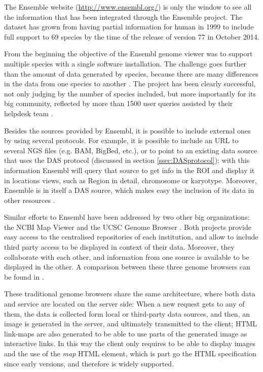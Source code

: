 The Ensemble website (\url{http://www.ensembl.org/}) is only the window to see all the information that has been integrated through the Ensemble project. The dataset has grown from having partial information for human in 1999 to include full support to 69 species by the time of the release of version 77 in October 2014. 

From the beginning the objective of the Ensembl genome viewer was to support multiple species with a single software installation. The challenge goes further than the amount of data generated by species, because there are many differences in the data from one species to another \cite{STA2004}. The project has been clearly successful, not only judging by the number of species included, but more importantly for its big community, reflected by more than 1500 user queries assisted by their helpdesk team \cite{CUN2014}.

Besides the sources provided by Ensembl, it is possible to include external ones by using several protocols. For example, it is possible to include an URL to several NGS files (e.g. BAM, BigBed, etc.), or to point to an existing data source that uses the DAS protocol (discussed in section \ref{ssec:DASprotocol}); with this information Ensembl will query that source to get info in the ROI and display it in locations views, such as Region in detail, chromosome or karyotype. Moreover, Ensemble is in itself a DAS source, which makes easy the inclusion of its data in other resources \cite{SPU2010}.

Similar efforts to Ensembl have been addressed by two other big organizations: the NCBI Map Viewer \cite{ACL2014} and the UCSC Genome Browser \cite{ROS2014}. Both projects provide easy access to the centralised repositories of each institution, and allow to include third party access to be displayed in context of their data. Moreover, they collaborate with each other, and information from one source is available to be displayed in the other. A comparison between these three genome browsers can be found in \cite{FUR2006}.

These traditional genome browsers share the same architecture, where both data and service are located on the server side: When a new request gets to any of them, the data is collected form local or third-party data sources, and then, an image is generated in the server, and ultimately transmitted to the client; HTML link-maps are also generated to be able to use parts of the generated image as interactive links. In this way the client only requires to be able to display images and the use of the \emph{map} HTML element, which is part go the HTML specification since early versions, and therefore is widely supported.

